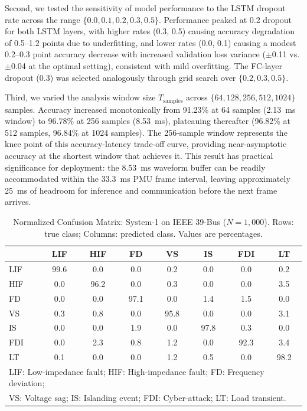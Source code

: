 \documentclass[journal]{IEEEtran}
\begin{document}
Second, we tested the sensitivity of model performance to the LSTM dropout rate across the range $\{0.0, 0.1, 0.2, 0.3, 0.5\}$. Performance peaked at 0.2 dropout for both LSTM layers, with higher rates (0.3, 0.5) causing accuracy degradation of 0.5--1.2 points due to underfitting, and lower rates (0.0, 0.1) causing a modest 0.2--0.3 point accuracy decrease with increased validation loss variance ($\pm$0.11 vs. $\pm$0.04 at the optimal setting), consistent with mild overfitting. The FC-layer dropout (0.3) was selected analogously through grid search over $\{0.2, 0.3, 0.5\}$.

Third, we varied the analysis window size $T_{\text{samples}}$ across $\{64, 128, 256, 512, 1024\}$ samples. Accuracy increased monotonically from 91.23\% at 64 samples (2.13~ms window) to 96.78\% at 256 samples (8.53~ms), plateauing thereafter (96.82\% at 512 samples, 96.84\% at 1024 samples). The 256-sample window represents the knee point of this accuracy-latency trade-off curve, providing near-asymptotic accuracy at the shortest window that achieves it. This result has practical significance for deployment: the 8.53~ms waveform buffer can be readily accommodated within the 33.3~ms PMU frame interval, leaving approximately 25~ms of headroom for inference and communication before the next frame arrives.



\begin{table}[!t]
\centering
\caption{Normalized Confusion Matrix: System-1 on IEEE 39-Bus ($N=1,000$). Rows: true class; Columns: predicted class. Values are percentages.}
\label{tab:confusion}
\begin{tabular}{lccccccc}
\toprule
& \textbf{LIF} & \textbf{HIF} & \textbf{FD} & \textbf{VS} & \textbf{IS} & \textbf{FDI} & \textbf{LT} \\
\midrule
LIF & 99.6 & 0.0 & 0.0 & 0.2 & 0.0 & 0.0 & 0.2 \\
HIF & 0.0 & 96.2 & 0.0 & 0.3 & 0.0 & 0.0 & 3.5 \\
FD  & 0.0 & 0.0 & 97.1 & 0.0 & 1.4 & 1.5 & 0.0 \\
VS  & 0.3 & 0.8 & 0.0 & 95.8 & 0.0 & 0.0 & 3.1 \\
IS  & 0.0 & 0.0 & 1.9 & 0.0 & 97.8 & 0.3 & 0.0 \\
FDI & 0.0 & 2.3 & 0.8 & 1.2 & 0.0 & 92.3 & 3.4 \\
LT  & 0.1 & 0.0 & 0.0 & 1.2 & 0.5 & 0.0 & 98.2 \\
\bottomrule
\multicolumn{8}{l}{\footnotesize LIF: Low-impedance fault; HIF: High-impedance fault; FD: Frequency deviation;} \\
\multicolumn{8}{l}{\footnotesize VS: Voltage sag; IS: Islanding event; FDI: Cyber-attack; LT: Load transient.} \\
\end{tabular}
\end{table}
\end{document}
